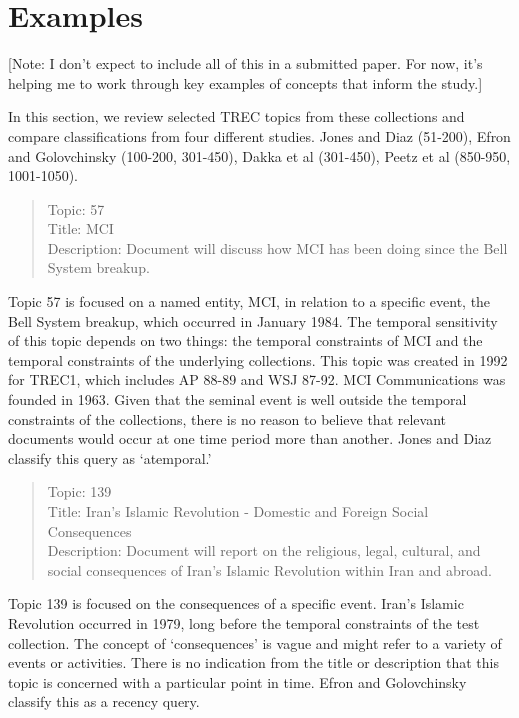 \documentclass{sig-alternate}
\begin{document}
\section{Examples}

[Note: I don't expect to include all of this in a submitted paper.  For now, it's helping me to work through key examples of concepts that inform the study.]

In this section, we review selected TREC topics from these collections and compare classifications from four different studies.  Jones and Diaz (51-200), Efron and Golovchinsky (100-200, 301-450), Dakka et al (301-450), Peetz et al (850-950, 1001-1050).

\begin{quote}
Topic: 57\\
Title: MCI\\
Description: Document will discuss how MCI has been doing since the Bell System breakup.
\end{quote}

Topic 57 is focused on a named entity, MCI, in relation to a specific event, the Bell System breakup, which occurred in January 1984. The temporal sensitivity of this topic depends on two things: the temporal constraints of MCI and the temporal constraints of the underlying collections. This topic was created in 1992 for TREC1, which includes AP 88-89 and WSJ 87-92. MCI Communications was founded in 1963. Given that the seminal event is well outside the temporal constraints of the collections, there is no reason to believe that relevant documents would occur at one time period more than another.  Jones and Diaz classify this query as `atemporal.'

\begin{quote}
Topic: 139  \\
Title: Iran's Islamic Revolution - Domestic and Foreign Social  Consequences	 \\
Description: Document will report on the religious, legal, cultural, and social  consequences of Iran's Islamic Revolution within Iran and abroad. \\
\end{quote}

Topic 139 is focused on the consequences of a specific event. Iran's Islamic Revolution occurred in 1979, long before the temporal constraints of the test collection. The concept of `consequences' is vague and might refer to a variety of events or activities. There is no indication from the title or description that this topic is concerned with a particular point in time.  Efron and Golovchinsky classify this as a recency query.
\end{document}
